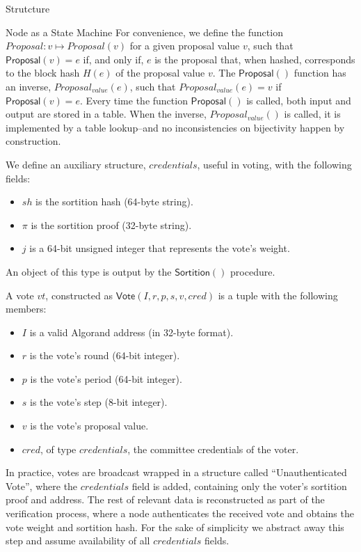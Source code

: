 \documentclass[10pt,a4paper]{article}
\begin{document}
\begin{section}{Strutcture}
\begin{subsection}{Node as a State Machine}
For convenience, we define the function $Proposal:v\mapsto{Proposal}(v)$ for a given proposal value 
$v$,  such that $\mathsf{Proposal}(v) = e$ if, and only if, $e$ is the proposal that, when hashed, corresponds 
to the block hash $H(e)$ of the proposal value $v$. 
The $\mathsf{Proposal}()$ function has an inverse, $Proposal_{value}(e)$, such that
$Proposal_{value}(e) = v$ if $\mathsf{Proposal}(v) = e$.
Every time the function $\mathsf{Proposal}()$ is called, both input and output are stored
in a table. When the inverse, $Proposal_{value}()$ is called, it is implemented
by a table lookup--and no inconsistencies on bijectivity happen by construction.



We define an auxiliary structure, $credentials$, useful in voting, with the following fields:
\begin{itemize}
    \item $sh$ is the sortition hash (64-byte string).
    \item $\pi$ is the sortition proof (32-byte string).
    \item $j$ is a 64-bit unsigned integer that represents the vote's weight.
\end{itemize}
An object of this type is output by the $\mathsf{Sortition}()$ procedure.

A vote $vt$, constructed as $\mathsf{Vote}(I,r,p,s,v,cred)$ is a tuple with the following members:
\begin{itemize}
    \item $I$ is a valid Algorand address (in 32-byte format).
    \item $r$ is the vote's round (64-bit integer).
    \item $p$ is the vote's period (64-bit integer).
    \item $s$ is the vote's step (8-bit integer).
    \item $v$ is the vote's proposal value.
    \item $cred$, of type $credentials$, the committee credentials of the voter.
\end{itemize}

In practice, votes are broadcast wrapped in a structure called ``Unauthenticated Vote'', 
where the $credentials$ field is added, containing only the voter's sortition proof and 
address.
The rest of relevant data is reconstructed as part of the verification process, 
where a node authenticates the received vote and obtains the vote weight and sortition hash.
For the sake of simplicity we abstract away this step and assume availability of all 
$credentials$ fields.



\end{subsection}
\end{section}
\end{document}
